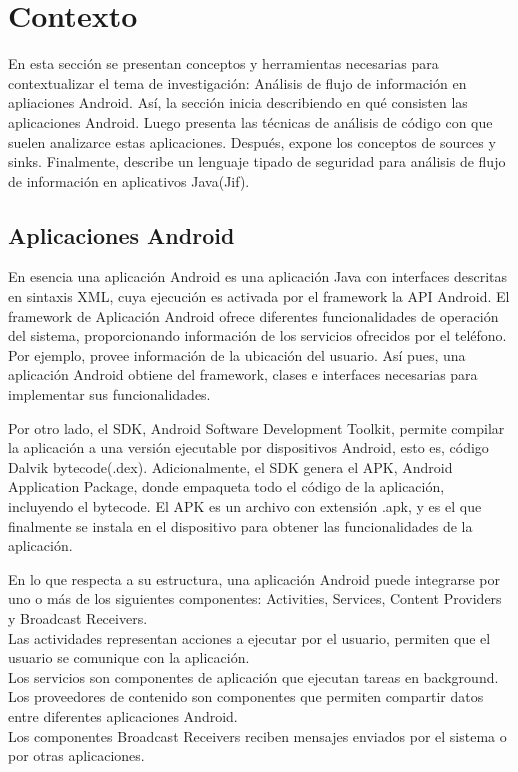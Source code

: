\section{Contexto}
\label{sec:context}
En esta sección se presentan conceptos y herramientas necesarias para
contextualizar el tema de investigación: Análisis de flujo de información en
apliaciones Android.
Así, la sección inicia describiendo en qué consisten las aplicaciones Android. Luego presenta
las técnicas de análisis de código con que suelen analizarce estas aplicaciones.
Después, expone los conceptos de sources y sinks. Finalmente, describe un
lenguaje tipado de seguridad para análisis de flujo de información en
aplicativos Java(Jif).
\subsection{Aplicaciones Android}
En esencia una aplicación Android es una aplicación Java con interfaces
descritas en sintaxis XML, cuya ejecución es activada por el framework la API
Android.\newline 
El framework de Aplicación Android ofrece diferentes funcionalidades de
operación del sistema, proporcionando información de los servicios ofrecidos por
el teléfono. Por ejemplo, provee información de la ubicación del
usuario.\newline 
Así pues, una aplicación Android obtiene del framework, clases e interfaces
necesarias para implementar sus funcionalidades.

Por otro lado, el SDK, Android Software Development Toolkit, permite compilar
la aplicación a una versión ejecutable por dispositivos Android, esto es, código
Dalvik bytecode(.dex). Adicionalmente, el SDK genera el APK, Android Application
Package, donde empaqueta todo el código de la aplicación, incluyendo el
bytecode. El APK es un archivo con extensión .apk, y es el que finalmente se
instala en el dispositivo para obtener las funcionalidades de la aplicación.

En lo que respecta a su estructura, 
una aplicación Android puede integrarse por uno o más de los siguientes
componentes: Activities, Services, Content Providers y Broadcast Receivers.\\
Las actividades representan acciones a ejecutar por el usuario, permiten que el
usuario se comunique con la aplicación.\\
Los servicios son componentes de aplicación que ejecutan tareas en background.\\
Los proveedores de contenido son componentes que permiten compartir datos entre
diferentes aplicaciones Android.\\
Los componentes Broadcast Receivers reciben mensajes enviados por el sistema o
por otras aplicaciones.

